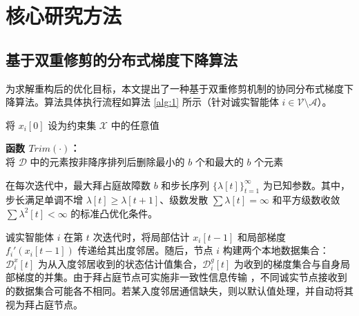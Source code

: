 \chapter{核心研究方法}

\section{基于双重修剪的分布式梯度下降算法}
为求解重构后的优化目标，本文提出了一种基于双重修剪机制的协同分布式梯度下降算法。算法具体执行流程如算法 \ref{alg:1} 所示（针对诚实智能体 $i\in\mathcal{V}\setminus\mathcal{A}$）。

\begin{algorithm}[H]
    将 $x_i[0]$ 设为约束集 $\mathcal{X}$ 中的任意值\;
    \caption{拜占庭容错梯度下降（诚实智能体 $i\in\mathcal{V}\setminus\mathcal{A}$ 的本地程序）}
    \label{alg:1}
    \noindent\textbf{函数 $Trim(\cdot)$：} \\
    将 $\mathcal{D}$ 中的元素按非降序排列后删除最小的 $b$ 个和最大的 $b$ 个元素 \\
\end{algorithm}

在每次迭代中，最大拜占庭故障数 $b$ 和步长序列 $\{\lambda[t]\}_{t=1}^{\infty}$ 为已知参数。其中，步长满足单调不增 $\lambda[t] \ge \lambda[t+1]$、级数发散 $\sum \lambda[t] = \infty$ 和平方级数收敛 $\sum \lambda^2[t] < \infty$ 的标准凸优化条件。

诚实智能体 $i$ 在第 $t$ 次迭代时，将局部估计 $x_i[t-1]$ 和局部梯度 $f_i'(x_i[t-1])$ 传递给其出度邻居。随后，节点 $i$ 构建两个本地数据集合：$\mathcal{D}_i^x[t]$ 为从入度邻居收到的状态估计值集合，$\mathcal{D}_i^g[t]$ 为收到的梯度集合与自身局部梯度的并集。由于拜占庭节点可实施非一致性信息传输 ，不同诚实节点接收到的数据集合可能各不相同。若某入度邻居通信缺失，则以默认值处理，并自动将其视为拜占庭节点。

